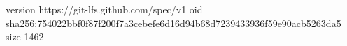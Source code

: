 version https://git-lfs.github.com/spec/v1
oid sha256:754022bbf0f87f200f7a3cebefe6d16d94b68d7239433936f59e90acb5263da5
size 1462
